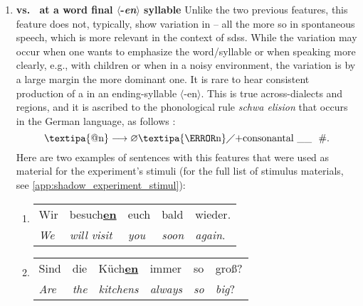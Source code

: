 \begin{enumerate}
	\item \textbf{\textipa{[@n]} vs.\ \textipa{[\s{n}]} at a word final $\langle$-\textit{en}$\rangle$ syllable}
	Unlike the two previous features, this feature does not, typically, show variation in -- all the more so in spontaneous speech, which is more relevant in the context of \acp{sds}.
	While the \textipa{[@n]} variation may occur when one wants to emphasize the word/syllable or when speaking more clearly, e.g., with children or when in a noisy environment, the \textipa{[\s{n}]} variation is by a large margin the more dominant one.
	It is rare to hear consistent production of a \textipa{[@n]} in an ending-syllable $\langle$-en$\rangle$.
	This is true across-dialects and regions, and it is ascribed to the phonological rule \textit{schwa elision} that occurs in the German language, as follows \citep[adapted from][pp.~142--143]{Benware1986phonetics}:
	\begin{equation}
		\text{\textipa{@n}}\longrightarrow \varnothing \text{\textipa{\s{n}}} \diagup
		\text{+consonantal} \ \_\_ \ \ \text{\#} .
		\label{eq:elision_rule}
	\end{equation}
	Here are two examples of sentences with this features that were used as material for the experiment's stimuli (for the full list of stimulus materials, see \cref{app:shadow_experiment_stimul}):
	
	\begin{enumerate}[label=\arabic{enumi}\alph*), ref=\arabic{enumi}\alph*.)]
		\item 
		\begin{tabulary}{\linewidth}{LLLLL}
			Wir 		& besuch\textbf{\underline{en}} & euch 		   & bald 		   & wieder.\\
			\textit{We} & \textit{will visit} 			& \textit{you} & \textit{soon} & \textit{again}.\\
		\end{tabulary}
		\item
		\begin{tabulary}{\linewidth}{LLLLLL}
			Sind 		 & die 			& Küch\textbf{\underline{en}} & immer		    & so 		  & groß?\\
			\textit{Are} & \textit{the} & \textit{kitchens} 		  & \textit{always} & \textit{so} & \textit{big}?\\
		\end{tabulary}
	\end{enumerate}
\end{enumerate}

